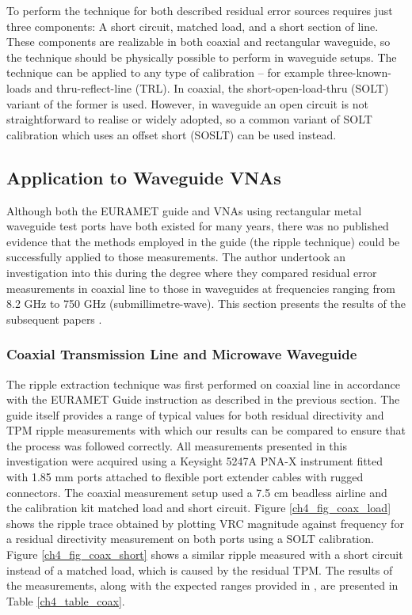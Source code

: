\documentclass[../thesis/thesis.tex]{subfiles}
\begin{document}
\begin{refsection}
To perform the technique for both described residual error sources requires just three components: A short circuit, matched load, and a short section of line. These components are realizable in both coaxial and rectangular waveguide, so the technique should be physically possible to perform in waveguide setups. The technique can be applied to any type of calibration – for example three-known-loads and thru-reflect-line (TRL). In coaxial, the short-open-load-thru (SOLT) variant of the former is used. However, in waveguide an open circuit is not straightforward to realise or widely adopted, so a common variant of SOLT calibration which uses an offset short (SOSLT) can be used instead.

\subsection{Application to Waveguide VNAs}

Although both the EURAMET guide and VNAs using rectangular metal waveguide test ports have both existed for many years, there was no published evidence that the methods employed in the guide (the ripple technique) could be successfully applied to those measurements. The author undertook an investigation into this during the degree where they compared residual error measurements in coaxial line to those in waveguides at frequencies ranging from 8.2 GHz to 750 GHz (submillimetre-wave). This section presents the results of the subsequent papers \cite{Stant_2016_Coll, Stant_2017}.

\subsubsection{Coaxial Transmission Line and Microwave Waveguide}

The ripple extraction technique was first performed on coaxial line in accordance with the EURAMET Guide \cite{EURAMET_2011} instruction as described in the previous section. The guide itself provides a range of typical values for both residual directivity and TPM ripple measurements with which our results can be compared to ensure that the process was followed correctly. All measurements presented in this investigation were acquired using a Keysight 5247A PNA-X instrument fitted with 1.85 mm ports attached to flexible port extender cables with rugged connectors. The coaxial measurement setup used a 7.5 cm beadless airline and the calibration kit matched load and short circuit. Figure \ref{ch4_fig_coax_load} shows the ripple trace obtained by plotting VRC magnitude against frequency for a residual directivity measurement on both ports using a SOLT calibration. Figure \ref{ch4_fig_coax_short} shows a similar ripple measured with a short circuit instead of a matched load, which is caused by the residual TPM. The results of the measurements, along with the expected ranges provided in \cite{EURAMET_2011}, are presented in Table \ref{ch4_table_coax}.


\end{refsection}
\end{document}
